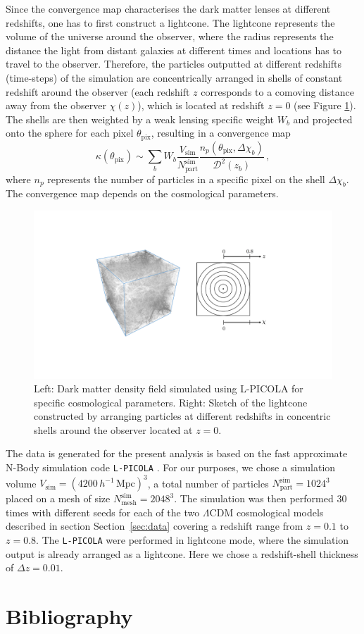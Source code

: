 \documentclass[final,twocolumn,3p,times,sort&compress]{elsarticle}
\newcommand{\secref}[1]{Section~\ref{sec:#1}}
\newcommand{\1}{\b{1}}              %
\newcommand{\0}{\b{0}}              %
\newcommand{\pkg}[1]{\texttt{#1}}
\begin{document}
Since the convergence map characterises the dark matter lenses at different redshifts, one has to first construct a lightcone. The lightcone represents the volume of the universe around the observer, where the radius represents the distance the light from distant galaxies at different times and locations has to travel to the observer. Therefore, the particles outputted at different redshifts (time-steps) of the simulation are concentrically arranged in shells of constant redshift around the observer (each redshift $z$ corresponds to a comoving distance away from the observer $\chi(z)$), which is located at redshift $z=0$ (see Figure \ref{fig:sketch_lightcone_simulation}). The shells are then weighted by a weak lensing specific weight $W_b$ and projected onto the sphere for each pixel $\theta_\mathrm{pix}$, resulting in a convergence map
\begin{equation}
\kappa (\theta_\mathrm{pix}) \sim \sum_b W_b \frac{V_\mathrm{sim}}{N_\mathrm{part}^\mathrm{sim}} \frac{n_p (\theta_\mathrm{pix}, \Delta \chi_b)}{\mathcal{D}^2 (z_b)}  \, ,
\end{equation}
where $n_p$ represents the number of particles in a specific pixel on the shell $\Delta \chi_b$. The convergence map depends on the cosmological parameters.

\begin{figure}
	\centering
	\includegraphics[width=\linewidth]{sketch_lightcone_simulation}
	\caption{Left: Dark matter density field simulated using L-PICOLA for specific cosmological parameters. Right: Sketch of the lightcone constructed by arranging particles at different redshifts in concentric shells around the observer located at $z=0$.}
	\label{fig:sketch_lightcone_simulation}
\end{figure}

The data is generated for the present analysis is based on the fast approximate N-Body simulation code \pkg{L-PICOLA} \citep{howlett2015lpicola}. For our purposes, we chose a simulation volume $V_\mathrm{sim} = (4200 \, h^{-1}\, \mathrm{Mpc})^3$, a total number of particles $N_\mathrm{part}^\mathrm{sim} = 1024^3$ placed on a mesh of size $N_\mathrm{mesh}^\mathrm{sim} = 2048^3$. The simulation was then performed 30 times with different seeds for each of the two $\Lambda$CDM cosmological models described in section \secref{data} covering a redshift range from $z = 0.1$ to $z = 0.8$. The \pkg{L-PICOLA} were performed in lightcone mode, where the simulation output is already arranged as a lightcone. Here we chose a redshift-shell thickness of $\Delta z = 0.01$.

\section*{Bibliography}


\end{document}
